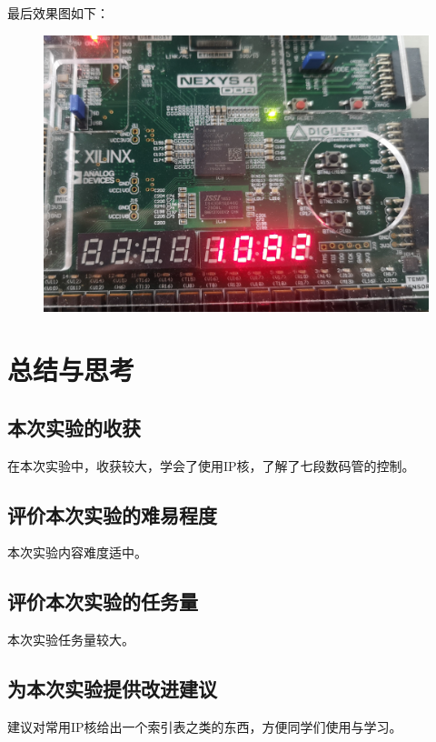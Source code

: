 \documentclass[UTF8]{article}
\begin{document}
	最后效果图如下：\par
	\begin{figure}[H]
		\centering
		\includegraphics[width=1\linewidth]{e3_1.jpg}
		\label{e3_1}
	\end{figure}\par
	
	
	
	
	
	
	\section{总结与思考}	
	\subsection{本次实验的收获}
	在本次实验中，收获较大，学会了使用IP核，了解了七段数码管的控制。\par
	
	\subsection{评价本次实验的难易程度}
	本次实验内容难度适中。\par
	
	\subsection{评价本次实验的任务量}
	本次实验任务量较大。\par
	
	\subsection{为本次实验提供改进建议}
	建议对常用IP核给出一个索引表之类的东西，方便同学们使用与学习。\par
	
\end{document}
